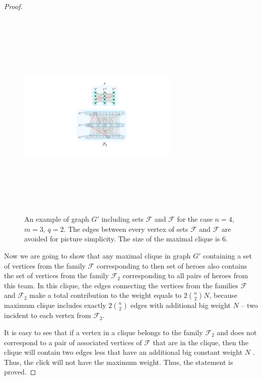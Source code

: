 \documentclass{article}
\begin{document}
\begin{proof}
\begin{figure}[h!]
\begin{center}
\includegraphics[height=4in,width=3in,angle=0]{figure1.pdf}
\caption{An example of graph $G'$ including sets $\mathcal{F}$ and $\mathcal{F}$ for the case $n=4$, $m=3$, $q=2$. The edges between every vertex of sets $\mathcal{F}$ and $\mathcal{F}$ are avoided for picture simplicity. The size of the maximal clique is 6. }
\label{fig:reduction}
\end{center}
\end{figure}
    
    Now we are going to show that any maximal clique in graph $G'$ containing a set of vertices from the family $\mathcal{F}$ corresponding to then set of heroes also contains the set of vertices from the family $\mathcal {F}_2$ corresponding to all pairs of heroes from this team. In this clique, the edges connecting the vertices from the families $\mathcal{F}$ and $ \mathcal {F}_2$ make a total contribution to the weight equals to $2 \binom{n}{2} N$, because maximum clique includes exactly $2 \binom {n} {2}$ edges with additional big weight $N$ -- two incident to each vertex from $\mathcal {F}_2$.
    
    	It is easy to see that if a vertex in a clique belongs to the family $\mathcal{F}_2 $ and does not correspond to a pair of associated vertices of $ \mathcal {F} $ that are in the clique, then the clique will contain two edges less that have an additional big constant weight $N$ . Thus, the click will not have the maximum weight. Thus, the statement is proved.
    	

\end{proof}
\end{document}
